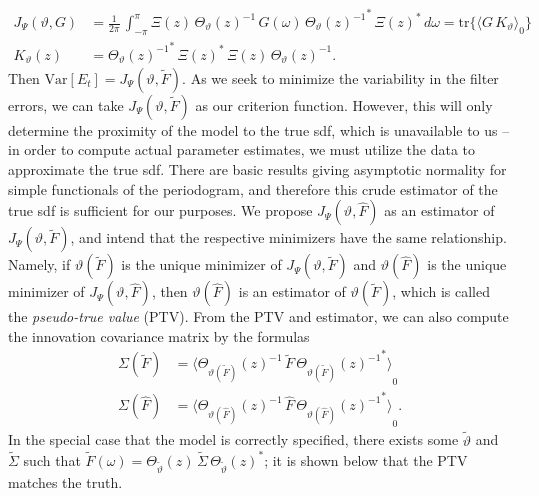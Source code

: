 \documentclass[a4paper]{book}
\begin{document}
\begin{align*}
  J_{\Psi} (\vartheta, G) & 	= \frac{1}{2 \pi} \, \int_{-\pi}^{\pi} \Xi (z) \,
  { \Theta_{\vartheta} (z) }^{-1} \, G(\omega)
  \,  {{ \Theta_{\vartheta} (z) }^{-1} }^* \, { \Xi (z) }^* \, d\omega  = \mbox{tr} \{ 
 { \langle G \, K_{\vartheta} \rangle }_0 \} \\
   K_{\vartheta} (z) & =  {{ \Theta_{\vartheta} (z) }^{-1} }^* \, { \Xi (z) }^* \,  \Xi (z) \, 
 { \Theta_{\vartheta} (z) }^{-1}.
\end{align*}
 Then $\mbox{Var} [ E_t ] = J_{\Psi} (\vartheta, \widetilde{F})$.  As we seek to minimize the variability in the filter errors,
 we can take $J_{\Psi} (\vartheta, \widetilde{F})$ as our criterion function.  However, this will only
 determine the proximity of the model to the true sdf, which is unavailable to us -- in order to compute actual
 parameter estimates, we must utilize the data to approximate the true sdf. 
 There are basic results giving asymptotic normality for simple functionals 
 of the periodogram,
 and therefore this crude  estimator of the true sdf is sufficient for our purposes.  We propose 
$J_{\Psi} (\vartheta, \widehat{F})$ as
 an estimator of $J_{\Psi} (\vartheta, \widetilde{F})$, and intend that the respective minimizers have the same relationship.
 Namely, if $\vartheta (\widetilde{F}) $ is the unique minimizer of 
 $J_{\Psi} (\vartheta, \widetilde{F}) $ and
  $\vartheta (\widehat{F}) $ is the unique minimizer of $J_{\Psi} (\vartheta, \widehat{F}) $, then
 $\vartheta (\widehat{F})$ is an estimator of $\vartheta (\widetilde{F})$, which is called the {\em pseudo-true value} (PTV).
  From the PTV and estimator, we can also compute the innovation covariance matrix by the formulas
\begin{align*}
  \Sigma (\widetilde{F}) & = { \langle { \Theta_{\vartheta (\widetilde{F} ) } (z) }^{-1} \,
   \widetilde{F} \, 
 { { \Theta_{\vartheta(\widetilde{F}) } (z) }^{-1} }^*
	\rangle }_0 \\
    \Sigma (\widehat{F}) & = { \langle { \Theta_{\vartheta (\widehat{F} ) } (z) }^{-1} \, \widehat{F} \, 
{ { \Theta_{\vartheta(\widehat{F}) } (z) }^{-1} }^*
	\rangle }_0.
\end{align*}
 In the special case that the model is correctly specified, there exists some 
$\widetilde{\vartheta}$ and $\widetilde{\Sigma}$ such that
 $\widetilde{F} (\omega) = \Theta_{\widetilde{\vartheta}} (z) \, \widetilde{\Sigma} \, 
{\Theta_{\widetilde{\vartheta}} (z)  }^*$; it is shown below
  that the PTV matches the truth.
 
\end{document}
